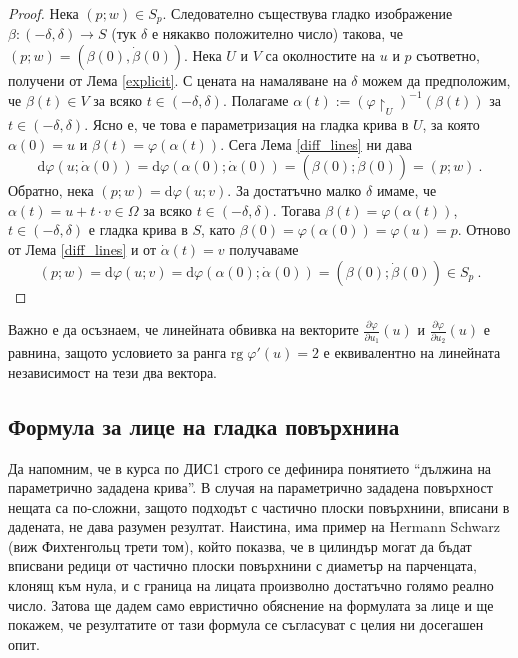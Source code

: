 \documentclass[11pt]{article}
\numberwithin{equation}{section}
\numberwithin{figure}{section}
\numberwithin{table}{section}
\theoremstyle{plain}
\theoremstyle{definition}
\theoremstyle{remark}
\theoremstyle{definition}
\theoremstyle{remark}
\theoremstyle{plain}
\theoremstyle{definition}
\theoremstyle{definition}
\theoremstyle{plain}
\theoremstyle{plain}
\theoremstyle{plain}
\theoremstyle{definition}
\theoremstyle{plain}
\begin{document}
\begin{proof}
Нека $(p;w)\in S_{p}$. Следователно съществува гладко изображение \\$\beta:(-\delta,\delta)\longrightarrow S$ (тук $\delta$ е някакво положително число) такова, че $(p;w)=(\beta(0),\dot{\beta}(0))$. Нека $U$ и $V$ са околностите на $u$ и $p$ съответно, получени от Лема \ref{explicit}. С цената на намаляване на $\delta$ можем да предположим, че $\beta(t)\in V$ за всяко $t\in (-\delta,\delta)$. Полагаме $\alpha(t):= \left(\varphi\restriction_{U}\right)^{-1} (\beta(t))$ за $t\in (-\delta,\delta)$. Ясно е, че това е параметризация на гладка крива в $U$, за която $\alpha(0)=u$ и $\beta(t)=\varphi(\alpha(t))$. Сега Лема \ref{diff_lines} ни дава $$\textrm{d}\varphi(u;\dot\alpha(0))=\textrm{d}\varphi(\alpha(0);\dot\alpha(0))=(\beta(0);\dot\beta(0))=(p;w) \ .$$
Обратно, нека $(p;w)=\textrm{d}\varphi(u;v)$. За достатъчно малко $\delta$ имаме, че $\alpha(t)=u+t\cdot v\in \Omega$ за всяко $t\in (-\delta,\delta)$. Тогава $\beta(t)=\varphi(\alpha(t))$, $t\in (-\delta,\delta)$ е гладка крива в $S$, като $\beta(0)=\varphi(\alpha(0))=\varphi(u)=p$. Отново от Лема \ref{diff_lines} и от $\dot\alpha(t)=v$ получаваме
$$(p;w)=\textrm{d}\varphi(u;v)=\textrm{d}\varphi(\alpha(0);\dot\alpha(0))=(\beta(0);\dot\beta(0))\in S_p \ .$$
\end{proof}

Важно е да осъзнаем, че линейната обвивка на векторите $\frac{\partial\varphi}{\partial u_1}(u)$ и $\frac{\partial\varphi}{\partial u_2}(u)$ е равнина, защото условието за ранга $\textrm{rg}\; \varphi' (u)=2$ е еквивалентно на линейната независимост на тези два вектора.

\subsection{Формула за лице на гладка повърхнина}

Да напомним, че в курса по ДИС1 строго се дефинира понятието ``дължина на параметрично зададена крива''. В случая на параметрично зададена повърхност нещата са по-сложни, защото подходът с частично плоски повърхнини, вписани в дадената, не дава разумен резултат. Наистина, има пример на Hermann Schwarz (виж Фихтенгольц трети том), който показва, че в цилиндър могат да бъдат вписвани редици от частично плоски повърхнини с диаметър на парченцата, клонящ към нула, и с граница на лицата произволно достатъчно голямо реално число. Затова ще дадем само евристично обяснение на формулата за лице и ще покажем, че резултатите от тази формула се съгласуват с целия ни досегашен опит.
\end{document}
